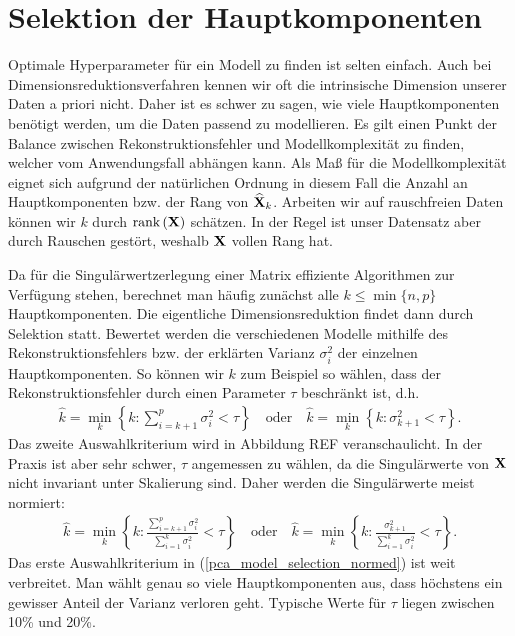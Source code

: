 \section{Selektion der Hauptkomponenten}
\label{selection_principal_components}

Optimale Hyperparameter für ein Modell zu finden ist selten einfach. Auch bei Dimensionsreduktionsverfahren kennen wir oft die intrinsische Dimension unserer Daten a priori nicht. Daher ist es schwer zu sagen, wie viele Hauptkomponenten benötigt werden, um die Daten passend zu modellieren. Es gilt einen Punkt der Balance zwischen Rekonstruktionsfehler und Modellkomplexität zu finden, welcher vom Anwendungsfall abhängen kann. Als Maß für die Modellkomplexität eignet sich aufgrund der natürlichen Ordnung in diesem Fall die Anzahl an Hauptkomponenten bzw. der Rang von $\widehat{\mathbf{X}}_k$. Arbeiten wir auf rauschfreien Daten können wir $k$ durch $\text{rank} \left( \mathbf{X} \right)$ schätzen. In der Regel ist unser Datensatz aber durch Rauschen gestört, weshalb $\mathbf{X}$ vollen Rang hat.

Da für die Singulärwertzerlegung einer Matrix effiziente Algorithmen zur Verfügung stehen, berechnet man häufig zunächst alle $k \leq \min\{n, p\}$ Hauptkomponenten. Die eigentliche Dimensionsreduktion findet dann durch Selektion statt. Bewertet werden die verschiedenen Modelle mithilfe des Rekonstruktionsfehlers bzw. der erklärten Varianz $\sigma_i^2$ der einzelnen Hauptkomponenten. So können wir $k$ zum Beispiel so wählen, dass der Rekonstruktionsfehler durch einen Parameter $\tau$ beschränkt ist, d.h.
\begin{align}
\label{pca_model_selection}
\widehat{k} = \min_k \left\{k \colon \sum_{i = k+1}^{p} \sigma_i^2 < \tau \right\} \quad \text{oder} \quad \widehat{k} = \min_k \left\{k \colon \sigma_{k+1}^2 < \tau \right\}.
\end{align}
Das zweite Auswahlkriterium wird in Abbildung REF veranschaulicht.
In der Praxis ist aber sehr schwer, $\tau$ angemessen zu wählen, da die Singulärwerte von $\mathbf{X}$ nicht invariant unter Skalierung sind. Daher werden die Singulärwerte meist normiert:
\begin{align}
\label{pca_model_selection_normed}
\widehat{k} = \min_k \left\{k \colon \frac{\sum_{i = k+1}^{p} \sigma_i^2}{\sum_{i=1}^k \sigma_i^2} < \tau \right\} \quad \text{oder} \quad \widehat{k} = \min_k \left\{k \colon \frac{\sigma_{k+1}^2}{\sum_{i=1}^k \sigma_i^2} < \tau \right\}.
\end{align}
Das erste Auswahlkriterium in (\ref{pca_model_selection_normed}) ist weit verbreitet. Man wählt genau so viele Hauptkomponenten aus, dass höchstens ein gewisser Anteil der Varianz verloren geht. Typische Werte für $\tau$ liegen zwischen 10\% und 20\%. 

